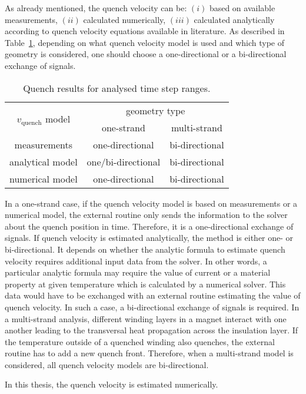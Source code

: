 As already mentioned, the quench velocity can be: $(i)$ based on available measurements, $(ii)$ calculated numerically, $(iii)$ calculated analytically according to quench velocity equations available in literature. As described in Table~\ref{table:uni_bi_directional_table_explanation}, depending on what quench velocity model is used and which type of geometry is considered, one should choose a one-directional or a bi-directional exchange of signals.

\begin{table}[H]
    \caption{Quench results for analysed time step ranges.} 
    \vspace{-1.em} 
    \fontsize{10}{10}
    \selectfont 
    \renewcommand{\arraystretch}{1.5}
    \begin{center}
        \begin{tabular}{ c | c | c }  
        \hline
         \multirow{2}{*}{$v_\text{quench}$ model} & \multicolumn{2}{c}{geometry type} \\ 
         & one-strand & multi-strand \\
         \hline
        measurements & one-directional & bi-directional \\
        analytical model & one/bi-directional & bi-directional \\
        numerical model & one-directional & bi-directional \\
        \hline 
        \end{tabular}
    \end{center}  
     \label{table:uni_bi_directional_table_explanation} 
 \end{table}

In a one-strand case, if the quench velocity model is based on measurements or a numerical model, the external routine only sends the information to the solver about the quench position in time. Therefore, it is a one-directional exchange of signals. If quench velocity is estimated analytically, the method is either one- or bi-directional. It depends on whether the analytic formula to estimate quench velocity requires additional input data from the solver. In other words, a particular analytic formula may require the value of current or a material property at given temperature which is calculated by a numerical solver. This data would have to be exchanged with an external routine estimating the value of quench velocity. In such a case, a bi-directional exchange of signals is required. In a multi-strand analysis, different winding layers in a magnet interact with one another leading to the transversal heat propagation across the insulation layer. If the temperature outside of a quenched winding also quenches, the external routine has to add a new quench front. Therefore, when a multi-strand model is considered, all quench velocity models are bi-directional.

In this thesis, the quench velocity is estimated numerically.
